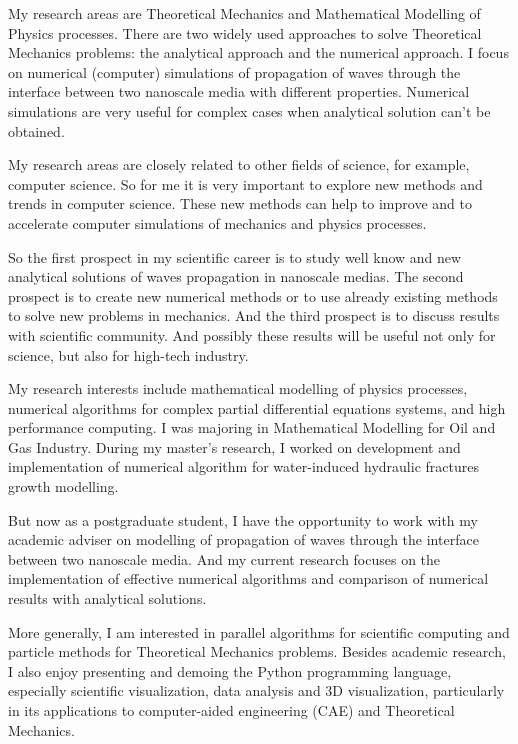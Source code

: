 \documentclass[main.tex]{subfiles}
\begin{document}
\setcounter{secnumdepth}{0}


\setcounter{section}{102}


\setcounter{subsection}{1}

My research areas are Theoretical Mechanics and Mathematical Modelling of Physics processes.
There are two widely used approaches to solve Theoretical Mechanics problems: the analytical approach and the numerical approach.
I focus on numerical (computer) simulations of propagation of waves through the interface between two nanoscale media with different properties.
Numerical simulations are very useful for complex cases when analytical solution can't be obtained.

My research areas are closely related to other fields of science, for example, computer science.
So for me it is very important to explore new methods and trends in computer science.
These new methods can help to improve and to accelerate computer simulations of mechanics and physics processes.

So the first prospect in my scientific career is to study well know and new analytical solutions of waves propagation in nanoscale medias.
The second prospect is to create new numerical methods or to use already existing methods to solve new problems in mechanics.
And the third prospect is to discuss results with scientific community.
And possibly these results will be useful not only for science, but also for high-tech industry.
\newpage


\setcounter{subsection}{2}

My research interests include mathematical modelling of physics processes, numerical algorithms for complex partial differential equations systems, and high performance computing.
I was majoring in Mathematical Modelling for Oil and Gas Industry.
During my master's research, I worked on development and implementation of numerical algorithm for water-induced hydraulic fractures growth modelling.

But now as a postgraduate student, I have the opportunity to work with my academic adviser on modelling of propagation of waves through the interface between two nanoscale media.
And my current research focuses on the implementation of effective numerical algorithms and comparison of numerical results with analytical solutions.

More generally, I am interested in parallel algorithms for scientific computing and particle methods for Theoretical Mechanics problems.
Besides academic research, I also enjoy presenting and demoing the Python programming language, especially scientific visualization, data analysis and 3D visualization, particularly in its applications to computer-aided engineering (CAE) and Theoretical Mechanics.
\newpage
\end{document}

